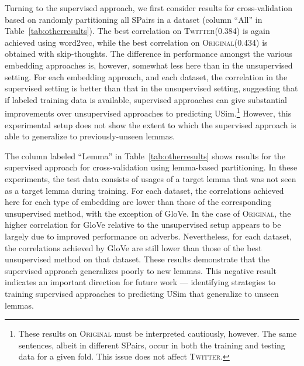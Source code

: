 \documentclass[11pt]{article}
\newcommand\original{\textsc{Original}\xspace}
\newcommand\twitter{\textsc{Twitter}\xspace}
\newcommand\glove{GloVe\xspace}
\newcommand{\tabref}[1]{Table~\ref{#1}}
\begin{document}
Turning to the supervised approach, we first consider results for
cross-validation based on randomly partitioning all SPairs in a
dataset (column ``All'' in \tabref{tab:otherresults}). The best
correlation on \twitter (0.384) is again achieved using word2vec,
while the best correlation on \original (0.434) is obtained with
skip-thoughts. The difference in performance amongst the various
embedding approaches is, however, somewhat less here than in the
unsupervised setting. For each embedding approach, and each dataset,
the correlation in the supervised setting is better than that in the
unsupervised setting, suggesting that if labeled training data is
available, supervised approaches can give substantial improvements
over unsupervised approaches to predicting USim.\footnote{These
  results on \original must be interpreted cautiously, however. The
  same sentences, albeit in different SPairs, occur in both the
  training and testing data for a given fold. This issue does not
  affect \twitter.} However, this experimental setup does not show the
extent to which the supervised approach is able to generalize to
previously-unseen lemmas.





The column labeled ``Lemma'' in \tabref{tab:otherresults} shows
results for the supervised approach for cross-validation using
lemma-based partitioning. In these experiments, the test data consists
of usages of a target lemma that was not seen as a target lemma during
training. For each dataset, the correlations achieved here for each
type of embedding are lower than those of the corresponding
unsupervised method, with the exception of \glove. In the case of
\original, the higher correlation for \glove relative to the
unsupervised setup appears to be largely due to improved performance
on adverbs. Nevertheless, for each dataset, the correlations
achieved by \glove are still lower than those of the best unsupervised
method on that dataset. These results demonstrate that the supervised
approach generalizes poorly to new lemmas. This negative result
indicates an important direction for future work --- identifying
strategies to training supervised approaches to predicting USim that
generalize to unseen lemmas.
\end{document}
